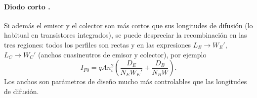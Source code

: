 \paragraph{Diodo corto .} Si además el emisor y el colector son más cortos que
sus longitudes de difusión (lo habitual en transistores integrados), se puede despreciar la
recombinación en las tres regiones: todos los perfiles son rectas y en las expresiones
$L_E\to W_E'$, $L_C\to W_C'$ (anchos cuasineutros de emisor y colector), por ejemplo
\[
  I_{F0} = qAn_i^2\left(\frac{D_E}{N_EW_E'}+\frac{D_B}{N_BW}\right).
\]
Los anchos son parámetros de diseño mucho más controlables que las longitudes de difusión.
